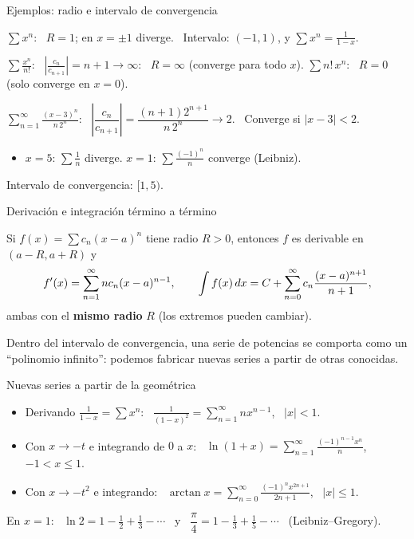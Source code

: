 \documentclass[10pt,aspectratio=169]{beamer}
\begin{document}
\begin{frame}{Ejemplos: radio e intervalo de convergencia}
  \begin{ejemplo}[4]
    $\displaystyle\sum x^n$: \ $R=1$; en $x=\pm1$ diverge. \ Intervalo: $(-1,1)$, y $\displaystyle\sum x^n=\frac1{1-x}$.
  \end{ejemplo}
  \begin{ejemplo}[5]
    $\displaystyle\sum\frac{x^n}{n!}$: \ $\left|\frac{c_n}{c_{n+1}}\right|=n+1\to\infty$: \ $R=\infty$ (converge para todo $x$).
    \quad $\displaystyle\sum n!\,x^n$: \ $R=0$ (solo converge en $x=0$).
  \end{ejemplo}
  \begin{ejemplo}[6]
    $\displaystyle\sum_{n=1}^\infty\frac{(x-3)^n}{n\,2^n}$: \ $\left|\dfrac{c_n}{c_{n+1}}\right|=\dfrac{(n+1)2^{n+1}}{n\,2^n}\to2$. \ Converge si $|x-3|<2$.
    \begin{itemize}
      \item $x=5$: $\sum\frac1n$ diverge. \quad $x=1$: $\sum\frac{(-1)^n}{n}$ converge (Leibniz).
    \end{itemize}
    Intervalo de convergencia: $[1,5)$.
  \end{ejemplo}
\end{frame}

\begin{frame}{Derivación e integración término a término}
  \begin{teorema}
    Si $f(x)=\sum c_n(x-a)^n$ tiene radio $R>0$, entonces $f$ es derivable en $(a-R,a+R)$ y
    \[ f'(x)=\sum_{n=1}^\infty nc_n(x-a)^{n-1},\qquad \int f(x)\,dx=C+\sum_{n=0}^\infty c_n\frac{(x-a)^{n+1}}{n+1}, \]
    ambas con el \textbf{mismo radio} $R$ (los extremos pueden cambiar).
  \end{teorema}
  \begin{idea}
    Dentro del intervalo de convergencia, una serie de potencias se comporta como un ``polinomio infinito'':
    podemos fabricar nuevas series a partir de otras conocidas.
  \end{idea}
\end{frame}

\begin{frame}{Nuevas series a partir de la geométrica}
  \begin{ejemplo}[7]
    \begin{itemize}
      \item Derivando $\frac1{1-x}=\sum x^n$: \ $\displaystyle\frac1{(1-x)^2}=\sum_{n=1}^\infty nx^{n-1}$, \ $|x|<1$.
      \item Con $x\to-t$ e integrando de $0$ a $x$: \ $\displaystyle\ln(1+x)=\sum_{n=1}^\infty\frac{(-1)^{n-1}x^n}{n}$, \ $-1<x\le1$.
      \item Con $x\to-t^2$ e integrando: \ $\displaystyle\arctan x=\sum_{n=0}^\infty\frac{(-1)^nx^{2n+1}}{2n+1}$, \ $|x|\le1$.
    \end{itemize}
    En $x=1$: \ $\ln2=1-\frac12+\frac13-\cdots$ \ y \ $\dfrac\pi4=1-\frac13+\frac15-\cdots$ \ (Leibniz--Gregory).
  \end{ejemplo}
\end{frame}
\end{document}
